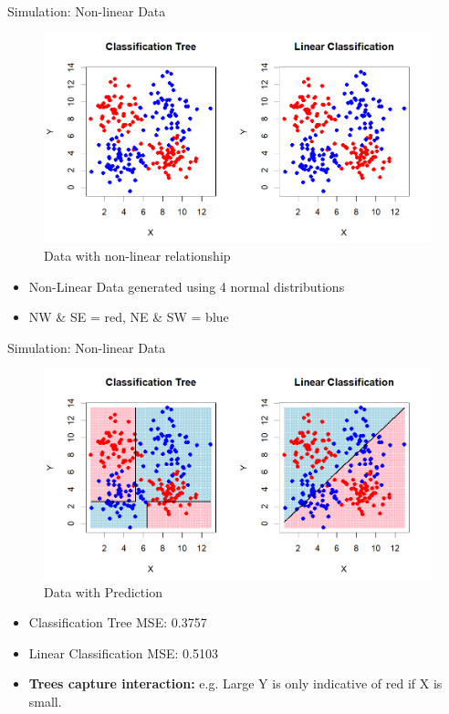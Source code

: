\documentclass[10pt]{beamer}
\begin{document}
\begin{frame}{Simulation: Non-linear Data}

    \begin{figure}
        \centering
        \includegraphics[scale=0.6]{NLD.png}
        \caption{Data with non-linear relationship}
        \label{fig:sub5}  %
    \end{figure}
    \vspace{-0.5cm}
    \begin{itemize}
        \item Non-Linear Data generated using 4 normal distributions
        \item NW \& SE = red, NE \& SW = blue
    \end{itemize}
\end{frame}


\begin{frame}{Simulation: Non-linear Data}
    \begin{figure}
        \centering
        \includegraphics[scale=0.6]{NLD Pred.png}
        \caption{Data with Prediction}
        \label{fig:sub6}  %
    \end{figure}
    \vspace{-0.5cm}
    \begin{itemize}
        \item Classification Tree MSE: 0.3757
        \item Linear Classification MSE: 0.5103
        \item \textbf{Trees capture interaction:} e.g. Large Y is only indicative of red if X is small.
    \end{itemize}
\end{frame}
\end{document}
